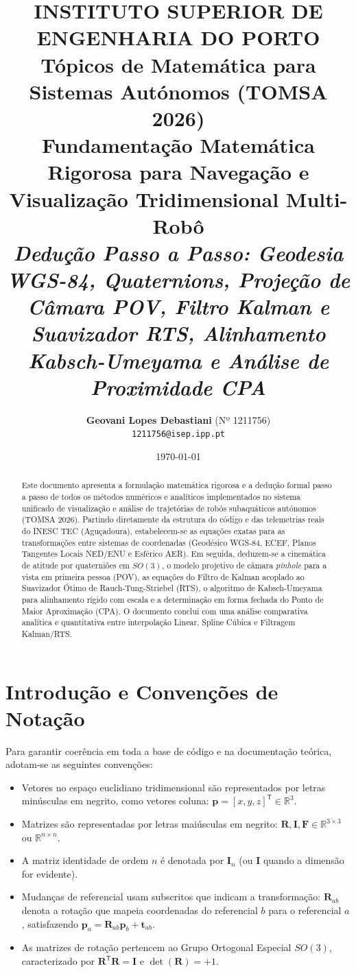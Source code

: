 \documentclass[11pt,a4paper]{article}
\title{
    \vspace{-1.5cm}
    \textbf{INSTITUTO SUPERIOR DE ENGENHARIA DO PORTO}\\[0.2cm]
    \large Tópicos de Matemática para Sistemas Autónomos (TOMSA 2026)\\[0.6cm]
    \Large \textbf{Fundamentação Matemática Rigorosa para Navegação e Visualização Tridimensional Multi-Robô}\\[0.3cm]
    \large \textit{Dedução Passo a Passo: Geodesia WGS-84, Quaternions, Projeção de Câmara POV, Filtro Kalman e Suavizador RTS, Alinhamento Kabsch-Umeyama e Análise de Proximidade CPA}
}
\author{
    \textbf{Geovani Lopes Debastiani} (Nº 1211756)\\
    \texttt{1211756@isep.ipp.pt}
}
\date{\today}
\newcommand{\vv}[1]{\mathbf{#1}}
\newcommand{\Rot}{\mathbf{R}}
\newcommand{\Id}{\mathbf{I}}
\newcommand{\T}{^{\mathsf{T}}}
\theoremstyle{definition}
\begin{document}
\maketitle

\begin{abstract}
Este documento apresenta a formulação matemática rigorosa e a dedução formal passo a passo de todos os métodos numéricos e analíticos implementados no sistema unificado de visualização e análise de trajetórias de robôs subaquáticos autónomos (TOMSA 2026). Partindo diretamente da estrutura do código e das telemetrias reais do INESC TEC (Aguçadoura), estabelecem-se as equações exatas para as transformações entre sistemas de coordenadas (Geodésico WGS-84, ECEF, Planos Tangentes Locais NED/ENU e Esférico AER). Em seguida, deduzem-se a cinemática de atitude por quaterniões em $SO(3)$, o modelo projetivo de câmara \textit{pinhole} para a vista em primeira pessoa (POV), as equações do Filtro de Kalman acoplado ao Suavizador Ótimo de Rauch-Tung-Striebel (RTS), o algoritmo de Kabsch-Umeyama para alinhamento rígido com escala e a determinação em forma fechada do Ponto de Maior Aproximação (CPA). O documento conclui com uma análise comparativa analítica e quantitativa entre interpolação Linear, Spline Cúbica e Filtragem Kalman/RTS.
\end{abstract}

\vspace{0.3cm}
\tableofcontents
\newpage

\section{Introdução e Convenções de Notação}

Para garantir coerência em toda a base de código e na documentação teórica, adotam-se as seguintes convenções:
\begin{itemize}[nosep]
    \item Vetores no espaço euclidiano tridimensional são representados por letras minúsculas em negrito, como vetores coluna: $\vv{p} = [x, y, z]\T \in \mathbb{R}^3$.
    \item Matrizes são representadas por letras maiúsculas em negrito: $\Rot, \Id, \mathbf{F} \in \mathbb{R}^{3\times 3}$ ou $\mathbb{R}^{n\times n}$.
    \item A matriz identidade de ordem $n$ é denotada por $\Id_n$ (ou $\Id$ quando a dimensão for evidente).
    \item Mudanças de referencial usam subscritos que indicam a transformação: $\Rot_{ab}$ denota a rotação que mapeia coordenadas do referencial $b$ para o referencial $a$, satisfazendo $\vv{p}_a = \Rot_{ab} \vv{p}_b + \vv{t}_{ab}$.
    \item As matrizes de rotação pertencem ao Grupo Ortogonal Especial $SO(3)$, caracterizado por $\Rot\T \Rot = \Id$ e $\det(\Rot) = +1$.
\end{itemize}
\end{document}
